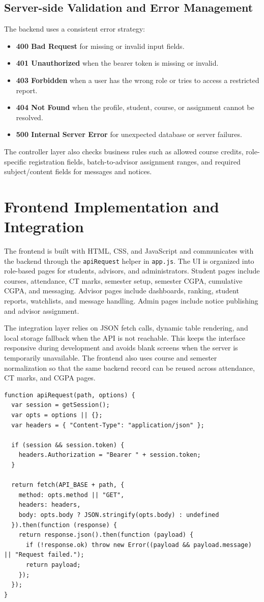 \documentclass[12pt,a4paper]{article}
\begin{document}
\subsection{Server-side Validation and Error Management}
The backend uses a consistent error strategy:
\begin{itemize}[leftmargin=*]
  \item \textbf{400 Bad Request} for missing or invalid input fields.
  \item \textbf{401 Unauthorized} when the bearer token is missing or invalid.
  \item \textbf{403 Forbidden} when a user has the wrong role or tries to access a restricted report.
  \item \textbf{404 Not Found} when the profile, student, course, or assignment cannot be resolved.
  \item \textbf{500 Internal Server Error} for unexpected database or server failures.
\end{itemize}

The controller layer also checks business rules such as allowed course credits, role-specific registration fields, batch-to-advisor assignment ranges, and required subject/content fields for messages and notices.

\section{Frontend Implementation and Integration}
The frontend is built with HTML, CSS, and JavaScript and communicates with the backend through the \texttt{apiRequest} helper in \texttt{app.js}. The UI is organized into role-based pages for students, advisors, and administrators. Student pages include courses, attendance, CT marks, semester setup, semester CGPA, cumulative CGPA, and messaging. Advisor pages include dashboards, ranking, student reports, watchlists, and message handling. Admin pages include notice publishing and advisor assignment.

The integration layer relies on JSON fetch calls, dynamic table rendering, and local storage fallback when the API is not reachable. This keeps the interface responsive during development and avoids blank screens when the server is temporarily unavailable. The frontend also uses course and semester normalization so that the same backend record can be reused across attendance, CT marks, and CGPA pages.

\begin{lstlisting}
function apiRequest(path, options) {
  var session = getSession();
  var opts = options || {};
  var headers = { "Content-Type": "application/json" };

  if (session && session.token) {
    headers.Authorization = "Bearer " + session.token;
  }

  return fetch(API_BASE + path, {
    method: opts.method || "GET",
    headers: headers,
    body: opts.body ? JSON.stringify(opts.body) : undefined
  }).then(function (response) {
    return response.json().then(function (payload) {
      if (!response.ok) throw new Error((payload && payload.message) || "Request failed.");
      return payload;
    });
  });
}
\end{lstlisting}
\end{document}
